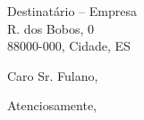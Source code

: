 \documentclass{letter}
\begin{document}
   \begin{letter}
      {
         Destinatário -- Empresa\\
         R. dos Bobos, 0\\
         88000-000, Cidade, ES
      }
      
      \opening{Caro Sr. Fulano,}
     
      \thispagestyle{fancy}
     
      \lipsum[1-2]
      
      \closing{Atenciosamente,}
      
   \end{letter}
\end{document}
